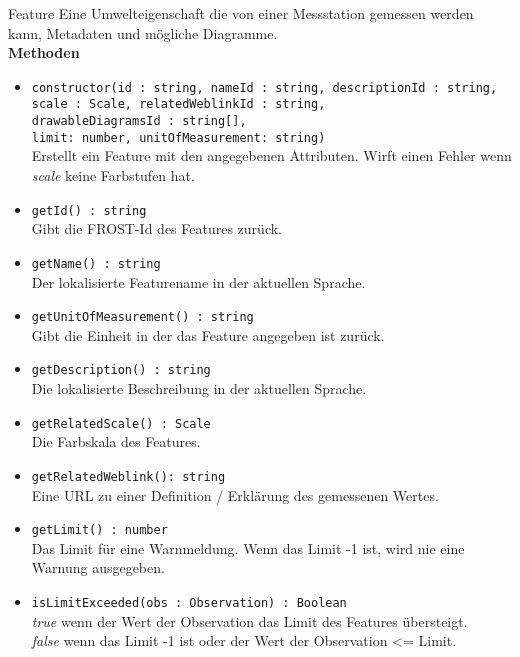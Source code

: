     \begin{Class}{Feature}
        Eine Umwelteigenschaft die von einer Messstation gemessen werden kann, Metadaten
        und mögliche Diagramme.
        \bigskip\\
        \textbf{Methoden}
        \begin{itemize}
            \item \texttt{constructor(id : string, nameId : string, descriptionId : string,\\
             scale : Scale, relatedWeblinkId : string,
            \\drawableDiagramsId : string[],
            \\limit: number, unitOfMeasurement: string)}
            \\ Erstellt ein Feature mit den angegebenen Attributen.
            Wirft einen Fehler wenn \emph{scale} keine Farbstufen hat.
            \item \texttt{getId() : string}
            \\ Gibt die FROST-Id des Features zurück.
            \item \texttt{getName() : string}
            \\ Der lokalisierte Featurename in der aktuellen Sprache.
            \item \texttt{getUnitOfMeasurement() : string}
            \\ Gibt die Einheit in der das Feature angegeben ist zurück.
            \item \texttt{getDescription() : string}
            \\  Die lokalisierte Beschreibung in der aktuellen Sprache.
            \item \texttt{getRelatedScale() : Scale}
            \\ Die Farbskala des Features.
            \item \texttt{getRelatedWeblink(): string}
            \\ Eine URL zu einer Definition / Erklärung des gemessenen Wertes.
            \item \texttt{getLimit() : number}
            \\ Das Limit für eine Warnmeldung. Wenn das Limit -1 ist, wird nie eine Warnung ausgegeben.
            \item \texttt{isLimitExceeded(obs : Observation) : Boolean}
            \\ \emph{true} wenn der Wert der Observation das Limit des Features übersteigt.
            \\ \emph{false} wenn das Limit -1 ist oder der Wert der Observation <= Limit.
        \end{itemize}
    \end{Class}

